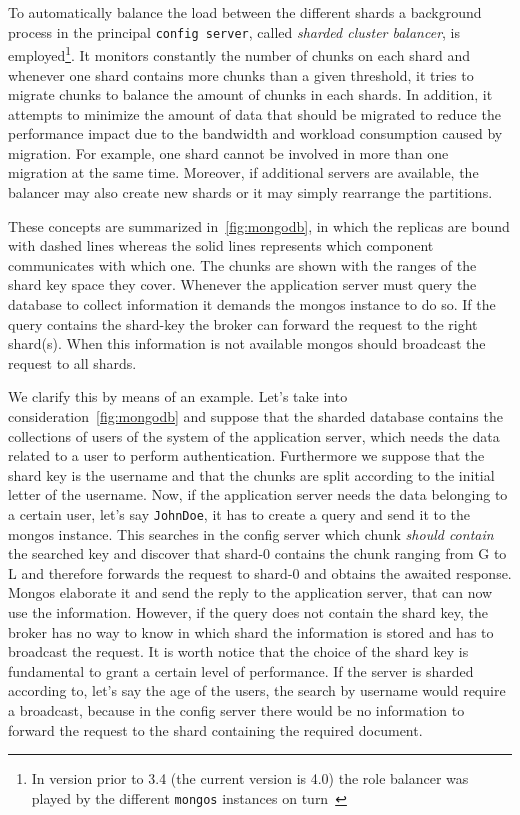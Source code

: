 To automatically balance the load between the different shards a background 
process in the principal \texttt{config server}, called \emph{sharded cluster 
balancer}, 
is employed\footnote{In version prior to 3.4 (the current version is 4.0) the
role balancer was played by the different \texttt{mongos} 
instances on turn~\cite{bib:mongodb-docs}}. It monitors constantly the number
of chunks on each shard and  whenever one  shard contains more chunks than a 
given threshold, it tries to migrate chunks to balance the amount of chunks
in each shards. In addition, it attempts to minimize the amount of data 
that should be migrated to reduce the performance impact due to the bandwidth 
and workload consumption caused by migration. For example, one shard cannot be 
involved in more than one migration at the same time. Moreover, if additional 
servers are available, the balancer may also create new shards or it may simply 
rearrange the partitions.

These concepts are summarized in~\autoref{fig:mongodb}, in which the replicas
are bound with dashed lines whereas the solid lines represents which
component communicates with which one. The chunks are shown with the
ranges of the shard key space they cover.
Whenever the application server must query the database to collect information
it demands the mongos instance to do so. If the query contains the shard-key
the broker can forward the request to the right shard(s). When this information
is not available mongos should broadcast the request to all shards.

We clarify this by means of an example. Let's take into 
consideration~\autoref{fig:mongodb} and suppose that the sharded database
contains the collections of users of the system of the application server,
which needs the data related to a user to perform authentication.
Furthermore we suppose that the shard key is the username and that the chunks
are split according to the initial letter of the username. Now, if the 
application server needs the data belonging to a certain user, let's say 
\texttt{JohnDoe}, it has to create a query and send it to the mongos instance. 
This searches in the config server which chunk \emph{should contain} the
searched key and discover that shard-0 contains the chunk ranging from G to L 
and therefore forwards the request to shard-0 and obtains the awaited response.
Mongos elaborate it and send the reply to the application server, that can now
use the information. However, if the query does not contain the shard key, the 
broker has no way to know in which shard the information is stored and has to
broadcast the request.
It is worth notice that the choice of the shard key is fundamental to grant a 
certain level of performance. If the server is sharded according to, let's say 
the age of the users, the search by username would require a broadcast, because
in the config server there would be no information to forward the request to 
the shard containing the required document.



